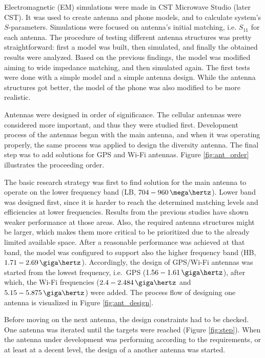 Electromagnetic (EM) simulations were made in CST Microwave Studio \cite{cst} (later CST). It was used to create antenna and phone models, and to calculate system's $S$-parameters. Simulations were focused on antenna's initial matching, i.e. $S_{11}$ for each antenna. The procedure of testing different antenna structures was pretty straightforward: first a model was built, then simulated, and finally the obtained results were analyzed. Based on the previous findings, the model was modified aiming to wide impedance matching, and then simulated again. The first tests were done with a simple model and a simple antenna design. While the antenna structures got better, the model of the phone was also modified to be more realistic.

Antennas were designed in order of significance. The cellular antennas were considered more important, and thus they were studied first. Development process of the antennas began with the main antenna, and when it was operating properly, the same process was applied to design the diversity antenna. The final step was to add solutions for GPS and Wi-Fi antennas. Figure \ref{fig:ant_order} illustrates the proceeding order. 

The basic research strategy was first to find solution for the main antenna to operate on the lower frequency band (LB, $704-960\,\mega\hertz$). Lower band was designed first, since it is harder to reach the determined matching levels and efficiencies at lower frequencies. Results from the previous studies have shown weaker performance at those areas. Also, the required antenna structures might be larger, which makes them more critical to be prioritized due to the already limited available space. After a reasonable performance was achieved at that band, the model was configured to support also the higher frequency band (HB, $1.71-2.69\,\giga\hertz$). Accordingly, the design of GPS/Wi-Fi antennas was started from the lowest frequency, i.e.\ GPS ($1.56-1.61\,\giga\hertz$), after which, the Wi-Fi frequencies ($2.4-2.484\,\giga\hertz$ and $5.15-5.875\,\giga\hertz$) were added. The process flow of designing one antenna is visualized in Figure \ref{fig:ant_design}.

Before moving on the next antenna, the design constraints had to be checked. One antenna was iterated until the targets were reached (Figure \ref{fig:step}). When the antenna under development was performing according to the requirements, or at least at a decent level, the design of a another antenna was started.

